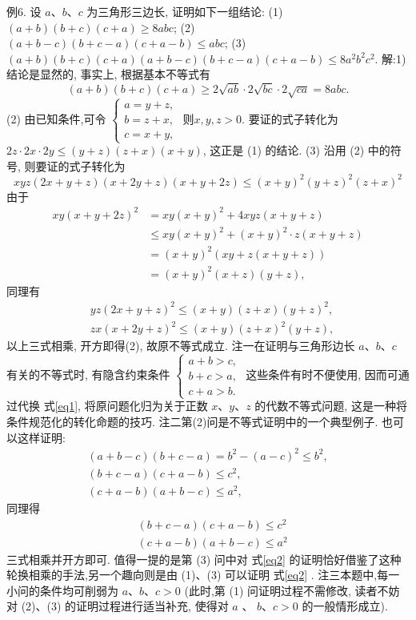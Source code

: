 例6. 设 $a 、 b 、 c$ 为三角形三边长, 证明如下一组结论:
(1) $(a+b)(b+c)(c+a) \geqslant 8 a b c$;
(2) $(a+b-c)(b+c-a)(c+a-b) \leqslant a b c$;
(3) $(a+b)(b+c)(c+a)(a+b-c)(b+c-a)(c+a-b) \leqslant 8 a^2 b^2 c^2$.
解:1) 结论是显然的, 事实上, 根据基本不等式有
$$
(a+b)(b+c)(c+a) \geqslant 2 \sqrt{a b} \cdot 2 \sqrt{b c} \cdot 2 \sqrt{c a}=8 a b c .
$$
(2) 由已知条件,可令 $\left\{\begin{array}{c}{{a=y+z,}}\\ {{b=z+x,}}\\ {{c=x+y,}}\end{array}\right.\label{eq1}$ 则$x,y,z>0$.
要证的式子转化为 $2 z \cdot 2 x \cdot 2 y \leqslant(y+z)(z+x)(x+y)$, 这正是 (1) 的结论.
(3) 沿用 (2) 中的符号, 则要证的式子转化为
$$
x y z(2 x+y+z)(x+2 y+z)(x+y+2 z) \leqslant(x+y)^2(y+z)^2(z+x)^2 \label{eq2}
$$
由于
$$
\begin{aligned}
x y(x+y+2 z)^2 & =x y(x+y)^2+4 x y z(x+y+z) \\
& \leqslant x y(x+y)^2+(x+y)^2 \cdot z(x+y+z) \\
& =(x+y)^2(x y+z(x+y+z)) \\
& =(x+y)^2(x+z)(y+z),
\end{aligned}
$$
同理有
$$
\begin{aligned}
& y z(2 x+y+z)^2 \leqslant(x+y)(z+x)(y+z)^2, \\
& z x(x+2 y+z)^2 \leqslant(x+y)(z+x)^2(y+z),
\end{aligned}
$$
以上三式相乘, 开方即得(2), 故原不等式成立.
注一在证明与三角形边长 $a 、 b 、 c$ 有关的不等式时, 有隐含约束条件 $\left\{\begin{array}{l}a+b>c, \\ b+c>a,\\ c+a>b .\end{array}\right.$ 这些条件有时不便使用, 因而可通过代换 式\ref{eq1}, 将原问题化归为关于正数 $x 、 y 、 z$ 的代数不等式问题, 这是一种将条件规范化的转化命题的技巧.
注二第(2)问是不等式证明中的一个典型例子.
也可以这样证明:
$$
\begin{gathered}
(a+b-c)(b+c-a)=b^2-(a-c)^2 \leqslant b^2, \\
(b+c-a)(c+a-b) \leqslant c^2, \\
(c+a-b)(a+b-c) \leqslant a^2,
\end{gathered}
$$
同理得
$$
\begin{aligned}
& (b+c-a)(c+a-b) \leqslant c^2 \\
& (c+a-b)(a+b-c) \leqslant a^2
\end{aligned}
$$
三式相乘并开方即可.
值得一提的是第 (3) 问中对 式\ref{eq2} 的证明恰好借鉴了这种轮换相乘的手法,另一个趣向则是由 (1)、(3) 可以证明 式\ref{eq2} .
注三本题中,每一小问的条件均可削弱为 $a 、 b 、 c>0$ (此时,第 (1) 问证明过程不需修改, 读者不妨对 (2)、(3) 的证明过程进行适当补充, 使得对 $a$ 、 $b 、 c>0$ 的一般情形成立).



